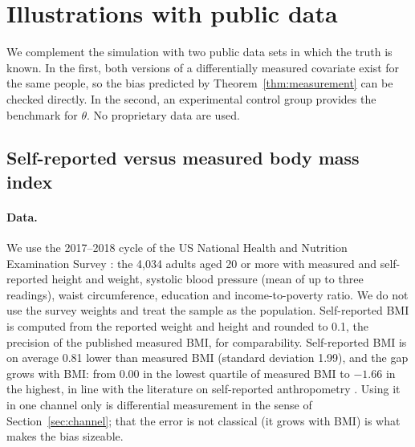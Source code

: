 \section{Illustrations with public data}\label{sec:illustrations}

We complement the simulation with two public data sets in which the truth is known. In the first, both versions of a differentially measured covariate exist for the same people, so the bias predicted by Theorem~\ref{thm:measurement} can be checked directly. In the second, an experimental control group provides the benchmark for $\theta$. No proprietary data are used.

\subsection{Self-reported versus measured body mass index}\label{sec:nhanes}

\paragraph{Data.} We use the 2017--2018 cycle of the US National Health and Nutrition Examination Survey \citep{nchs2020}: the 4{,}034 adults aged 20 or more with measured and self-reported height and weight, systolic blood pressure (mean of up to three readings), waist circumference, education and income-to-poverty ratio. We do not use the survey weights and treat the sample as the population. Self-reported BMI is computed from the reported weight and height and rounded to 0.1, the precision of the published measured BMI, for comparability. Self-reported BMI is on average 0.81 lower than measured BMI (standard deviation 1.99), and the gap grows with BMI: from 0.00 in the lowest quartile of measured BMI to $-1.66$ in the highest, in line with the literature on self-reported anthropometry \citep{connorgorber2007}. Using it in one channel only is differential measurement in the sense of Section~\ref{sec:channel}; that the error is not classical (it grows with BMI) is what makes the bias sizeable.

